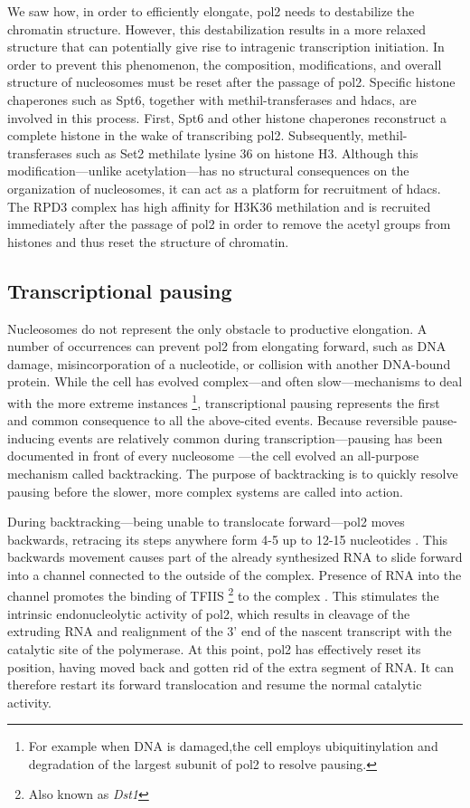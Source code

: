 We saw how, in order to efficiently elongate, \gls{pol2} needs to destabilize the chromatin structure.
However, this destabilization results in a more relaxed structure that can potentially give rise to intragenic transcription initiation.
In order to prevent this phenomenon, the composition, modifications, and overall structure of nucleosomes must be reset after the passage of \gls{pol2}. 
Specific histone chaperones such as Spt6, together with methil-transferases and \gls{hdacs}, are involved in this process.
First, Spt6 and other histone chaperones reconstruct a complete histone in the wake of transcribing \gls{pol2}.
Subsequently, methil-transferases such as Set2 methilate lysine 36 on histone H3. 
Although this modification---unlike acetylation---has no structural consequences on the organization of nucleosomes, it can act as a platform for recruitment of \gls{hdacs}.
The RPD3 complex has high affinity for H3K36 methilation and is recruited immediately after the passage of \gls{pol2} in order to remove the acetyl groups from histones and thus reset the structure of chromatin.

\subsection{Transcriptional pausing} \label{pausing}
Nucleosomes do not represent the only obstacle to productive elongation.
A number of occurrences can prevent \gls{pol2} from elongating forward, such as DNA damage, misincorporation of a nucleotide, or collision with another DNA-bound protein.
While the cell has evolved complex---and often slow---mechanisms to deal with the more extreme instances \footnote{For example when DNA is damaged,the cell employs ubiquitinylation and degradation of the largest subunit of \gls{pol2} to resolve pausing.}, transcriptional pausing represents the first and common consequence to all the above-cited events. 
Because reversible pause-inducing events are relatively common during transcription---pausing has been documented in front of every nucleosome \citep{churchman:2011:nascent}---the cell evolved an all-purpose mechanism called backtracking.
The purpose of backtracking is to quickly resolve pausing before the slower, more complex systems are called into action. 

During backtracking---being unable to translocate forward---\gls{pol2} moves backwards, retracing its steps anywhere form 4-5 up to 12-15 nucleotides \citep{cheung:2011:structural}.
This backwards movement causes part of the already synthesized RNA to slide forward into a channel connected to the outside of the complex.
Presence of RNA into the channel promotes the binding of TFIIS \footnote{Also known as \emph{Dst1}} to the complex \citep{cheung:2011:structural}.
This stimulates the intrinsic endonucleolytic activity of \gls{pol2}, which results in cleavage of the extruding RNA and realignment of the 3' end of the nascent transcript with the catalytic site of the polymerase.
At this point, \gls{pol2} has effectively reset its position, having moved back and gotten rid of the extra segment of RNA. 
It can therefore restart its forward translocation and resume the normal catalytic activity.

